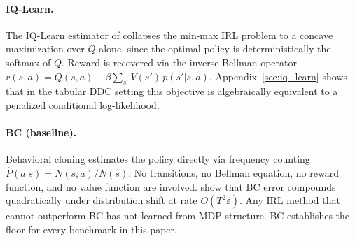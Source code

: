 \paragraph{IQ-Learn.}
The IQ-Learn estimator of \citet{garg2021} collapses the min-max IRL problem to a concave maximization over $Q$ alone, since the optimal policy is deterministically the softmax of $Q$.
Reward is recovered via the inverse Bellman operator $r(s,a) = Q(s,a) - \beta\sum_{s'} V(s')\,p(s'|s,a)$.
Appendix~\ref{sec:iq_learn} shows that in the tabular DDC setting this objective is algebraically equivalent to a penalized conditional log-likelihood.

\paragraph{BC (baseline).}
Behavioral cloning \citep{pomerleau1991} estimates the policy directly via frequency counting $\hat P(a|s) = N(s,a)/N(s)$.
No transitions, no Bellman equation, no reward function, and no value function are involved.
\citet{ross2011} show that BC error compounds quadratically under distribution shift at rate $O(T^2\varepsilon)$.
Any IRL method that cannot outperform BC has not learned from MDP structure.
BC establishes the floor for every benchmark in this paper.
